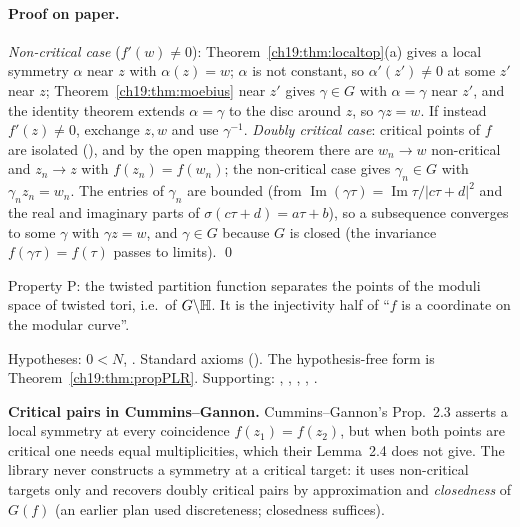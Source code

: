 \paragraph{Proof on paper.}  \emph{Non-critical case} ($f'(w)\ne0$): Theorem~\ref{ch19:thm:localtop}(a) gives a local symmetry $\alpha$ near $z$
with $\alpha(z)=w$; $\alpha$ is not constant, so $\alpha'(z')\ne0$ at some $z'$ near $z$; Theorem~\ref{ch19:thm:moebius} near $z'$ gives $\gamma\in G$
with $\alpha=\gamma$ near $z'$, and the identity theorem extends $\alpha=\gamma$ to the disc around $z$, so $\gamma z=w$.  If instead $f'(z)\ne0$, exchange
$z,w$ and use $\gamma^{-1}$.  \emph{Doubly critical case}: critical points of $f$ are isolated (),
and by the open mapping theorem there are $w_n\to w$ non-critical and $z_n\to z$ with $f(z_n)=f(w_n)$; the non-critical case gives
$\gamma_n\in G$ with $\gamma_nz_n=w_n$.  The entries of $\gamma_n$ are bounded (from $\operatorname{Im}(\gamma\tau)=\operatorname{Im}\tau/|c\tau+d|^2$ and
the real and imaginary parts of $\sigma(c\tau+d)=a\tau+b$), so a subsequence converges to some $\gamma$ with $\gamma z=w$, and $\gamma\in G$ because $G$
is closed (the invariance $f(\gamma\tau)=f(\tau)$ passes to limits). \qed
\begin{physics}Property P: the twisted partition function separates the points of the moduli space of twisted tori, i.e.\ of
$G\backslash\mathbb{H}$.  It is the injectivity half of ``$f$ is a coordinate on the modular curve''.\end{physics}
\begin{status}Hypotheses: $0<N$, .  Standard axioms ().
The hypothesis-free form is Theorem~\ref{ch19:thm:propPLR}.  Supporting: ,
, ,
, .\end{status}

\begin{warning}
\textbf{Critical pairs in Cummins--Gannon.}  Cummins--Gannon's
Prop.~2.3 asserts a local symmetry at every coincidence $f(z_1)=f(z_2)$, but when both points are critical one needs equal
multiplicities, which their Lemma~2.4 does not give.  The library never constructs a symmetry at a critical target: it uses
non-critical targets only and recovers doubly critical pairs by approximation and \emph{closedness} of $G(f)$ (an earlier plan used
discreteness; closedness suffices).
\end{warning}

